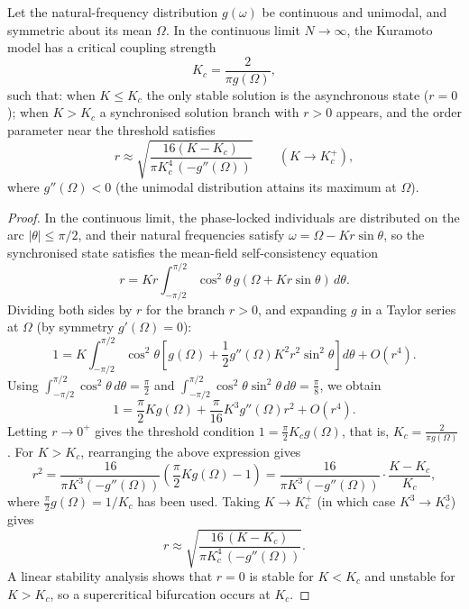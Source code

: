 \begin{lemma}\label{ch27_kuramoto_threshold}
Let the natural-frequency distribution $g(\omega)$ be continuous and unimodal, and symmetric about its mean $\Omega$. In the continuous limit $N\to\infty$, the Kuramoto model has a critical coupling strength
\[
K_c = \frac{2}{\pi g(\Omega)},
\]
such that: when $K \le K_c$ the only stable solution is the asynchronous state ($r=0$); when $K > K_c$ a synchronised solution branch with $r>0$ appears, and the order parameter near the threshold satisfies
\[
r \approx \sqrt{\frac{16(K-K_c)}{\pi K_c^4\,(-g''(\Omega))}} \qquad (K \to K_c^+),
\]
where $g''(\Omega) < 0$ (the unimodal distribution attains its maximum at $\Omega$).
\end{lemma}

\begin{proof}
In the continuous limit, the phase-locked individuals are distributed on the arc $|\theta| \le \pi/2$, and their natural frequencies satisfy $\omega = \Omega - Kr\sin\theta$, so the synchronised state satisfies the mean-field self-consistency equation
\[
r = K r \int_{-\pi/2}^{\pi/2} \cos^2\theta \, g(\Omega + K r \sin\theta)\, d\theta.
\]
Dividing both sides by $r$ for the branch $r>0$, and expanding $g$ in a Taylor series at $\Omega$ (by symmetry $g'(\Omega)=0$):
\[
1 = K\int_{-\pi/2}^{\pi/2}\cos^2\theta\left[g(\Omega) + \frac12 g''(\Omega)K^2r^2\sin^2\theta\right]d\theta + O(r^4).
\]
Using $\int_{-\pi/2}^{\pi/2}\cos^2\theta\,d\theta = \frac{\pi}{2}$ and $\int_{-\pi/2}^{\pi/2}\cos^2\theta\sin^2\theta\,d\theta = \frac{\pi}{8}$, we obtain
\[
1 = \frac{\pi}{2}Kg(\Omega) + \frac{\pi}{16}K^3g''(\Omega)r^2 + O(r^4).
\]
Letting $r\to0^+$ gives the threshold condition $1 = \frac{\pi}{2}K_c g(\Omega)$, that is, $K_c = \frac{2}{\pi g(\Omega)}$. For $K > K_c$, rearranging the above expression gives
\[
r^2 = \frac{16}{\pi K^3(-g''(\Omega))}\left(\frac{\pi}{2}Kg(\Omega) - 1\right)
= \frac{16}{\pi K^3(-g''(\Omega))}\cdot\frac{K-K_c}{K_c},
\]
where $\frac{\pi}{2}g(\Omega) = 1/K_c$ has been used. Taking $K \to K_c^+$ (in which case $K^3 \to K_c^3$) gives
\[
r \approx \sqrt{\frac{16\,(K-K_c)}{\pi K_c^4\,(-g''(\Omega))}}.
\]
A linear stability analysis shows that $r=0$ is stable for $K<K_c$ and unstable for $K>K_c$, so a supercritical bifurcation occurs at $K_c$.
\end{proof}

